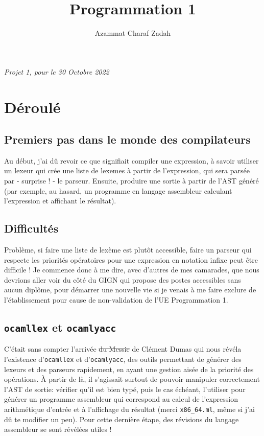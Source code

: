 \documentclass[12pt,french]{article}
\title{Programmation 1}
\author{Azammat Charaf Zadah}
\date{}
\date{}
\begin{document}
\maketitle
\begin{center}
    \textit{Projet 1, pour le 30 Octobre 2022}
\end{center}

\section{Déroulé}
\subsection{Premiers pas dans le monde des compilateurs}
Au début, j'ai dû revoir ce que signifiait compiler une expression, à savoir utiliser un lexeur qui crée une liste de lexemes à partir de l'expression, qui sera parsée par - surprise ! - le parseur. Ensuite, produire une sortie à partir de l'AST généré (par exemple, au hasard, un programme en langage assembleur calculant l'expression et affichant le résultat).
\subsection{Difficultés}
Problème, si faire une liste de lexème est plutôt accessible, faire un parseur qui respecte les priorités opératoires pour une expression en notation infixe peut être difficile ! Je commence donc à me dire, avec d'autres de mes camarades, que nous devrions aller voir du côté du GIGN qui propose des postes accessibles sans aucun diplôme, pour démarrer une nouvelle vie si je venais à me faire exclure de l'établissement pour cause de non-validation de l'UE Programmation 1.
\subsection{\texttt{ocamllex} et \texttt{ocamlyacc}}
C'était sans compter l'arrivée \sout{du Messie} de Clément Dumas qui nous révéla l'existence d'\texttt{ocamllex} et d'\texttt{ocamlyacc}, des outils permettant de générer des lexeurs et des parseurs rapidement, en ayant une gestion aisée de la priorité des opérations. À partir de là, il s'agissait surtout de pouvoir manipuler correctement l'AST de sortie: vérifier qu'il est bien typé, puis le cas échéant, l'utiliser pour générer un programme assembleur qui correspond au calcul de l'expression arithmétique d'entrée et à l'affichage du résultat (merci \texttt{x86\_64.ml}, même si j'ai dû te modifier un peu). Pour cette dernière étape, des révisions du langage assembleur se sont révélées utiles !
\newpage
\end{document}

